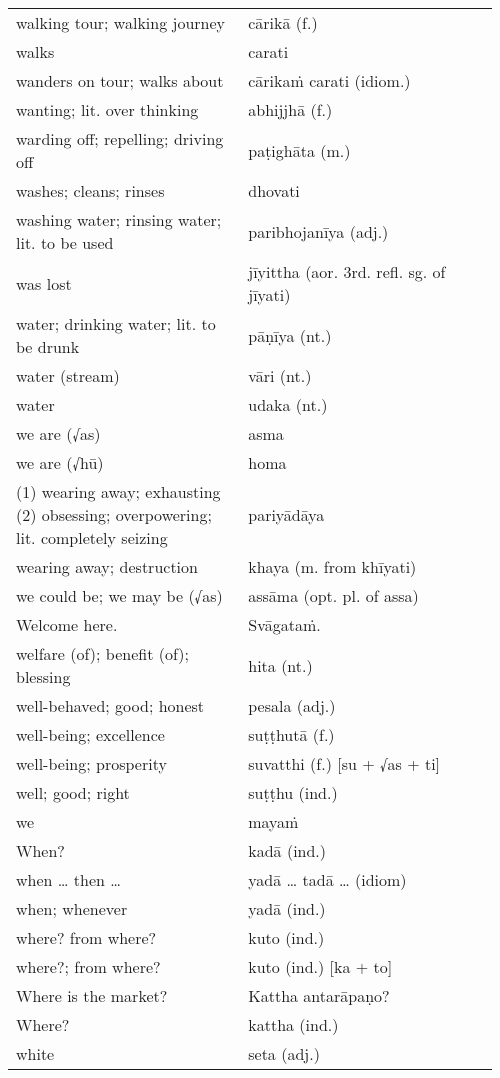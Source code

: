 \documentclass[a5paper]{memoir}
\begin{document}
\begin{longtable}{L{0.48\linewidth} L{0.48\linewidth} H}
walking tour; walking journey & cārikā (f.) & \\
walks & carati & \\
wanders on tour; walks about & cārikaṁ carati (idiom.) & \\
wanting; lit. over thinking & abhijjhā (f.) & \\
warding off; repelling; driving off & paṭighāta (m.) & \\
washes; cleans; rinses & dhovati & \\
washing water; rinsing water; lit. to be used & paribhojanīya (adj.) & \\
was lost & jīyittha (aor. 3rd. refl. sg. of jīyati) & \\
water; drinking water; lit. to be drunk & pāṇīya (nt.) & \\
water (stream) & vāri (nt.) & \\
water & udaka (nt.) & \\
we are (√as) & asma & \\
we are (√hū) & homa & \\
(1) wearing away; exhausting (2) obsessing; overpowering; lit. completely seizing & pariyādāya & \\
wearing away; destruction & khaya (m. from khīyati) & \\
we could be; we may be (√as) & assāma (opt. pl. of assa) & \\
Welcome here. & Svāgataṁ. & \\
welfare (of); benefit (of); blessing & hita (nt.) & \\
well-behaved; good; honest & pesala (adj.) & \\
well-being; excellence & suṭṭhutā (f.) & \\
well-being; prosperity & suvatthi (f.) [su + √as + ti] & \\
well; good; right & suṭṭhu (ind.) & \\
we & mayaṁ & \\
When? & kadā (ind.) & \\
when \ldots{} then \ldots{} & yadā \ldots{} tadā \ldots{} (idiom) & \\
when; whenever & yadā (ind.) & \\
where? from where? & kuto (ind.) & \\
where?; from where? & kuto (ind.) [ka + to] & \\
Where is the market? & Kattha antarāpaṇo? & \\
Where? & kattha (ind.) & \\
white & seta (adj.) & \\

\end{longtable}
\end{document}
